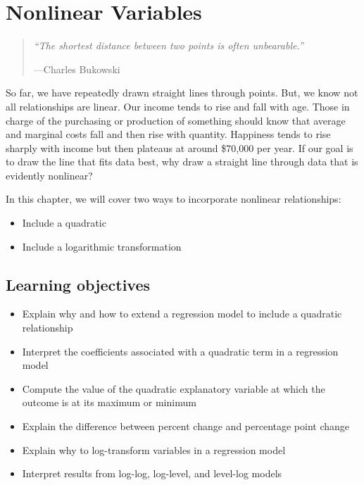 \documentclass[
]{book}
\providecommand{\tightlist}{%
  \setlength{\itemsep}{0pt}\setlength{\parskip}{0pt}}
\begin{document}
\hypertarget{nonlinear-variables}{%
\chapter{Nonlinear Variables}\label{nonlinear-variables}}

\begin{quote}
\emph{``The shortest distance between two points is often unbearable.''}

---Charles Bukowski
\end{quote}

So far, we have repeatedly drawn straight lines through points. But, we know not all relationships are linear. Our income tends to rise and fall with age. Those in charge of the purchasing or production of something should know that average and marginal costs fall and then rise with quantity. Happiness tends to rise sharply with income but then plateaus at around \$70,000 per year. If our goal is to draw the line that fits data best, why draw a straight line through data that is evidently nonlinear?

In this chapter, we will cover two ways to incorporate nonlinear relationships:

\begin{itemize}
\tightlist
\item
  Include a quadratic
\item
  Include a logarithmic transformation
\end{itemize}

\hypertarget{lo8}{%
\section{Learning objectives}\label{lo8}}

\begin{itemize}
\tightlist
\item
  Explain why and how to extend a regression model to include a quadratic relationship
\item
  Interpret the coefficients associated with a quadratic term in a regression model
\item
  Compute the value of the quadratic explanatory variable at which the outcome is at its maximum or minimum
\item
  Explain the difference between percent change and percentage point change
\item
  Explain why to log-transform variables in a regression model
\item
  Interpret results from log-log, log-level, and level-log models
\end{itemize}
\end{document}
